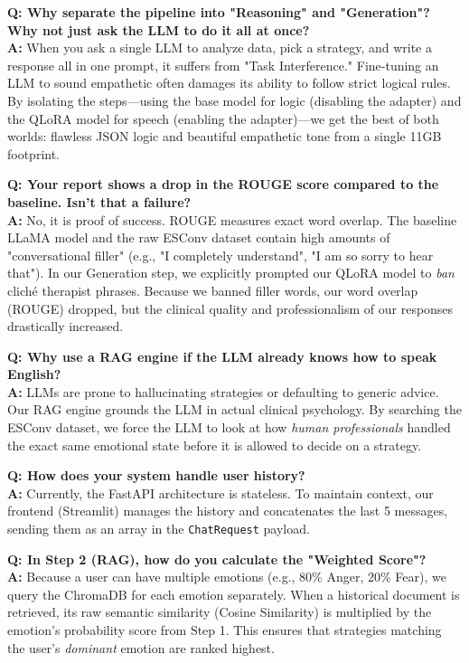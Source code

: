 \documentclass[12pt,a4paper]{article}
\begin{document}
\vspace{0.5cm}

\textbf{Q: Why separate the pipeline into "Reasoning" and "Generation"? Why not just ask the LLM to do it all at once?}\\
\textbf{A:} When you ask a single LLM to analyze data, pick a strategy, and write a response all in one prompt, it suffers from "Task Interference." Fine-tuning an LLM to sound empathetic often damages its ability to follow strict logical rules. By isolating the steps---using the base model for logic (disabling the adapter) and the QLoRA model for speech (enabling the adapter)---we get the best of both worlds: flawless JSON logic and beautiful empathetic tone from a single 11GB footprint.

\vspace{0.5cm}

\textbf{Q: Your report shows a drop in the ROUGE score compared to the baseline. Isn't that a failure?}\\
\textbf{A:} No, it is proof of success. ROUGE measures exact word overlap. The baseline LLaMA model and the raw ESConv dataset contain high amounts of "conversational filler" (e.g., "I completely understand", "I am so sorry to hear that"). In our Generation step, we explicitly prompted our QLoRA model to \textit{ban} cliché therapist phrases. Because we banned filler words, our word overlap (ROUGE) dropped, but the clinical quality and professionalism of our responses drastically increased.

\vspace{0.5cm}

\textbf{Q: Why use a RAG engine if the LLM already knows how to speak English?}\\
\textbf{A:} LLMs are prone to hallucinating strategies or defaulting to generic advice. Our RAG engine grounds the LLM in actual clinical psychology. By searching the ESConv dataset, we force the LLM to look at how \textit{human professionals} handled the exact same emotional state before it is allowed to decide on a strategy.

\vspace{0.5cm}

\textbf{Q: How does your system handle user history?}\\
\textbf{A:} Currently, the FastAPI architecture is stateless. To maintain context, our frontend (Streamlit) manages the history and concatenates the last 5 messages, sending them as an array in the \texttt{ChatRequest} payload. 

\vspace{0.5cm}

\textbf{Q: In Step 2 (RAG), how do you calculate the "Weighted Score"?}\\
\textbf{A:} Because a user can have multiple emotions (e.g., 80\% Anger, 20\% Fear), we query the ChromaDB for each emotion separately. When a historical document is retrieved, its raw semantic similarity (Cosine Similarity) is multiplied by the emotion's probability score from Step 1. This ensures that strategies matching the user's \textit{dominant} emotion are ranked highest.
\end{document}
